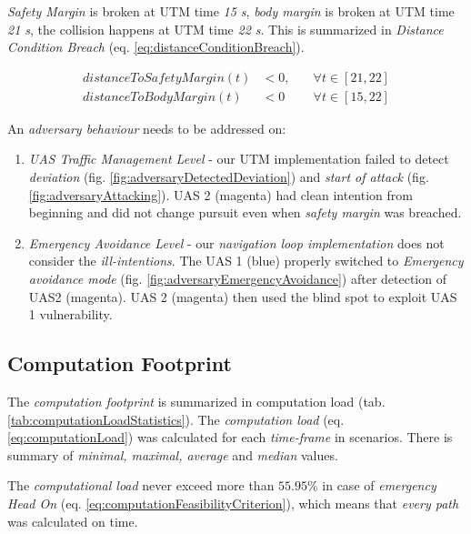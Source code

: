 \emph{Safety Margin} is broken at UTM time \emph{15 s}, \emph{body margin} is broken at UTM time \emph{21 s}, the collision happens at  UTM time \emph{22 s}. This is summarized in \emph{Distance Condition Breach} (eq. \ref{eq:distanceConditionBreach}).

\begin{equation}\label{eq:distanceConditionBreach}
    \begin{aligned}
    distanceToSafetyMargin(t) &< 0,\quad &\forall t \in [21,22]\\
    distanceToBodyMargin(t)  &< 0 \quad &\forall t \in [15,22]
    \end{aligned}
\end{equation}

\begin{note}
    An \emph{adversary behaviour} needs to be addressed on:
    \begin{enumerate}
        \item  \emph{UAS Traffic Management Level} -  our UTM implementation failed to detect \emph{deviation} (fig. \ref{fig:adversaryDetectedDeviation}) and \emph{start of attack} (fig. \ref{fig:adversaryAttacking}). UAS 2 (magenta) had clean intention from beginning and did not change pursuit even when \emph{safety margin} was breached. 
        
        \item  \emph{Emergency Avoidance Level} - our \emph{navigation loop implementation} does not consider the \emph{ill-intentions}. The UAS 1 (blue) properly switched to \emph{Emergency avoidance mode} (fig. \ref{fig:adversaryEmergencyAvoidance}) after detection of UAS2 (magenta). UAS 2 (magenta) then used the blind spot to exploit UAS 1 vulnerability.   
    \end{enumerate}
\end{note}

\subsection{Computation Footprint}\label{s:ComputaitonFootprint}

\noindent The \emph{computation footprint} is summarized in computation  load (tab. \ref{tab:computationLoadStatistics}). The \emph{computation load} (eq. \ref{eq:computationLoad}) was calculated for each \emph{time-frame} in scenarios. There is summary of \emph{minimal, maximal, average} and \emph{median} values.

The \emph{computational load} never exceed more than $55.95\%$ in case of  \emph{emergency Head On} (eq. \ref{eq:computationFeasibilityCriterion}), which means that \emph{every path} was calculated on time.


